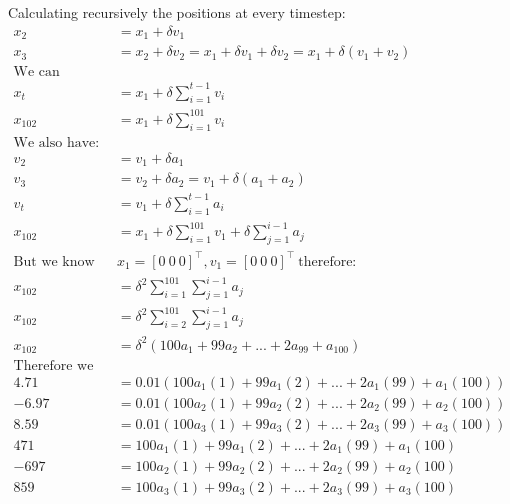 \documentclass[11pt,a4paper,oneside]{report}
\begin{document}
Calculating recursively the positions at every timestep:
\begin{align*}
x_2 &= x_1 + \delta v_1\\
x_3 &= x_2 + \delta v_2 = x_1 + \delta v_1 + \delta v_2 = x_1 + \delta (v_1+v_2)\\
\text{We can therefore derive that:}&\\
x_t &= x_1 + \delta \sum_{i=1}^{t-1}v_i\\
x_{102} &= x_1 + \delta \sum_{i=1}^{101}v_i\\
\text{We also have:}&\\
v_2 &= v_1 + \delta a_1\\
v_3 &= v_2 + \delta a_2 = v_1 + \delta (a_1+a_2)\\
v_t &= v_1 + \delta \sum_{i=1}^{t-1}a_i\\
x_{102} &= x_1 + \delta \sum_{i=1}^{101} v_1 + \delta \sum_{j=1}^{i-1}a_j\\
\text{But we know that:}\ & x_1 = [ 0\ 0\ 0 ]^\top, v_1 = [0\ 0\ 0]^\top \ \text{therefore:} \\
x_{102} &= \delta^2 \sum_{i=1}^{101}\sum_{j=1}^{i-1}a_j\\
x_{102} &= \delta^2 \sum_{i=2}^{101}\sum_{j=1}^{i-1}a_j\\
x_{102} &= \delta^2 (100a_1+99a_2+...+2a_{99}+a_{100})\\
\text{Therefore we have that:}&\\
4.71 &= 0.01(100a_1(1)+99a_1(2)+...+2a_1(99)+a_1(100))\\
-6.97 &= 0.01(100a_2(1)+99a_2(2)+...+2a_2(99)+a_2(100))\\
8.59 &= 0.01(100a_3(1)+99a_3(2)+...+2a_3(99)+a_3(100))\\
471 &= 100a_1(1)+99a_1(2)+...+2a_1(99)+a_1(100)\\
-697 &= 100a_2(1)+99a_2(2)+...+2a_2(99)+a_2(100)\\
859 &= 100a_3(1)+99a_3(2)+...+2a_3(99)+a_3(100)\\
\end{align*}
\end{document}
